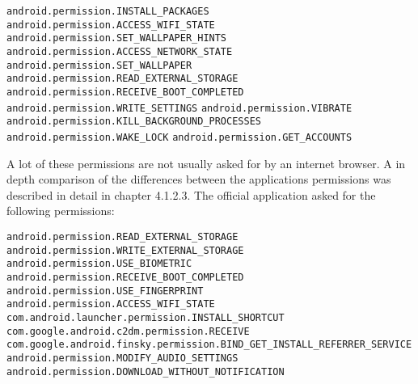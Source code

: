\newline \texttt{android.permission.INSTALL\_PACKAGES}
\newline \texttt{android.permission.ACCESS\_WIFI\_STATE}
\newline \texttt{android.permission.SET\_WALLPAPER\_HINTS}
\newline \texttt{android.permission.ACCESS\_NETWORK\_STATE}
\newline \texttt{android.permission.SET\_WALLPAPER}
\newline \texttt{android.permission.READ\_EXTERNAL\_STORAGE}
\newline \texttt{android.permission.RECEIVE\_BOOT\_COMPLETED}
\newline \texttt{android.permission.WRITE\_SETTINGS}
\newline \texttt{android.permission.VIBRATE}
\newline \texttt{android.permission.KILL\_BACKGROUND\_PROCESSES}
\newline \texttt{android.permission.WAKE\_LOCK}
\newline \texttt{android.permission.GET\_ACCOUNTS}

A lot of these permissions are not usually asked for by an internet browser.
A in depth comparison of the differences between the applications permissions was described in detail in chapter 4.1.2.3.
\newpage
{}
The official application asked for the following permissions:

\texttt{android.permission.READ\_EXTERNAL\_STORAGE }
\newline \texttt{android.permission.WRITE\_EXTERNAL\_STORAGE }
\newline \texttt{android.permission.USE\_BIOMETRIC }
\newline \texttt{android.permission.RECEIVE\_BOOT\_COMPLETED}
\newline \texttt{android.permission.USE\_FINGERPRINT }
\newline \texttt{android.permission.ACCESS\_WIFI\_STATE}
\newline \texttt{com.android.launcher.permission.INSTALL\_SHORTCUT }
\newline \texttt{com.google.android.c2dm.permission.RECEIVE}
\newline \texttt{com.google.android.finsky.permission.BIND\_GET\_INSTALL\_REFERRER\_SERVICE}
\newline \texttt{android.permission.MODIFY\_AUDIO\_SETTINGS }
\newline \texttt{android.permission.DOWNLOAD\_WITHOUT\_NOTIFICATION}

